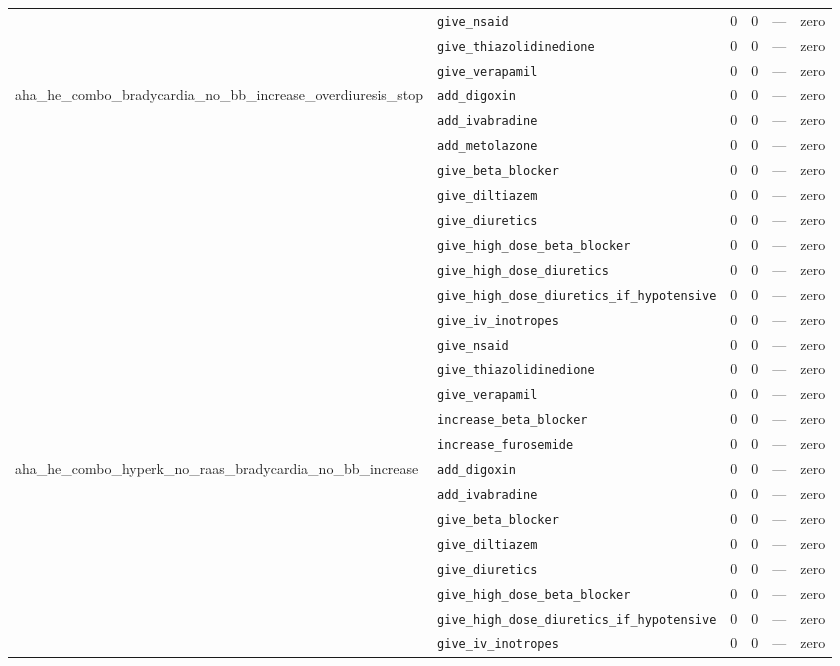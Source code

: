 \begin{table}[ht]
\begin{tabular}{llrrrl}
 & \texttt{give\_nsaid} & 0 & 0 & — & zero \\
 & \texttt{give\_thiazolidinedione} & 0 & 0 & — & zero \\
 & \texttt{give\_verapamil} & 0 & 0 & — & zero \\
\midrule
aha\_he\_combo\_bradycardia\_no\_bb\_increase\_overdiuresis\_stop & \texttt{add\_digoxin} & 0 & 0 & — & zero \\
 & \texttt{add\_ivabradine} & 0 & 0 & — & zero \\
 & \texttt{add\_metolazone} & 0 & 0 & — & zero \\
 & \texttt{give\_beta\_blocker} & 0 & 0 & — & zero \\
 & \texttt{give\_diltiazem} & 0 & 0 & — & zero \\
 & \texttt{give\_diuretics} & 0 & 0 & — & zero \\
 & \texttt{give\_high\_dose\_beta\_blocker} & 0 & 0 & — & zero \\
 & \texttt{give\_high\_dose\_diuretics} & 0 & 0 & — & zero \\
 & \texttt{give\_high\_dose\_diuretics\_if\_hypotensive} & 0 & 0 & — & zero \\
 & \texttt{give\_iv\_inotropes} & 0 & 0 & — & zero \\
 & \texttt{give\_nsaid} & 0 & 0 & — & zero \\
 & \texttt{give\_thiazolidinedione} & 0 & 0 & — & zero \\
 & \texttt{give\_verapamil} & 0 & 0 & — & zero \\
 & \texttt{increase\_beta\_blocker} & 0 & 0 & — & zero \\
 & \texttt{increase\_furosemide} & 0 & 0 & — & zero \\
\midrule
aha\_he\_combo\_hyperk\_no\_raas\_bradycardia\_no\_bb\_increase & \texttt{add\_digoxin} & 0 & 0 & — & zero \\
 & \texttt{add\_ivabradine} & 0 & 0 & — & zero \\
 & \texttt{give\_beta\_blocker} & 0 & 0 & — & zero \\
 & \texttt{give\_diltiazem} & 0 & 0 & — & zero \\
 & \texttt{give\_diuretics} & 0 & 0 & — & zero \\
 & \texttt{give\_high\_dose\_beta\_blocker} & 0 & 0 & — & zero \\
 & \texttt{give\_high\_dose\_diuretics\_if\_hypotensive} & 0 & 0 & — & zero \\
 & \texttt{give\_iv\_inotropes} & 0 & 0 & — & zero \\

\end{tabular}
\end{table}
